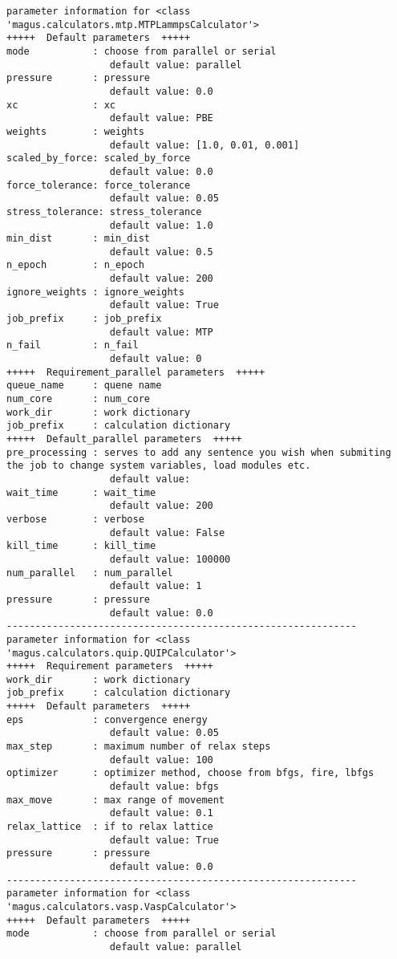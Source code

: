 \documentclass[12pt,oneside]{book}
\begin{document}
\begin{tcolorbox}
\begin{verbatim}
parameter information for <class 'magus.calculators.mtp.MTPLammpsCalculator'>
+++++  Default parameters  +++++
mode           : choose from parallel or serial
                  default value: parallel
pressure       : pressure
                  default value: 0.0
xc             : xc
                  default value: PBE
weights        : weights
                  default value: [1.0, 0.01, 0.001]
scaled_by_force: scaled_by_force
                  default value: 0.0
force_tolerance: force_tolerance
                  default value: 0.05
stress_tolerance: stress_tolerance
                  default value: 1.0
min_dist       : min_dist
                  default value: 0.5
n_epoch        : n_epoch
                  default value: 200
ignore_weights : ignore_weights
                  default value: True
job_prefix     : job_prefix
                  default value: MTP
n_fail         : n_fail
                  default value: 0
+++++  Requirement_parallel parameters  +++++
queue_name     : quene name
num_core       : num_core
work_dir       : work dictionary
job_prefix     : calculation dictionary
+++++  Default_parallel parameters  +++++
pre_processing : serves to add any sentence you wish when submiting the job to change system variables, load modules etc.
                  default value: 
wait_time      : wait_time
                  default value: 200
verbose        : verbose
                  default value: False
kill_time      : kill_time
                  default value: 100000
num_parallel   : num_parallel
                  default value: 1
pressure       : pressure
                  default value: 0.0
-------------------------------------------------------------
parameter information for <class 'magus.calculators.quip.QUIPCalculator'>
+++++  Requirement parameters  +++++
work_dir       : work dictionary
job_prefix     : calculation dictionary
+++++  Default parameters  +++++
eps            : convergence energy
                  default value: 0.05
max_step       : maximum number of relax steps
                  default value: 100
optimizer      : optimizer method, choose from bfgs, fire, lbfgs
                  default value: bfgs
max_move       : max range of movement
                  default value: 0.1
relax_lattice  : if to relax lattice
                  default value: True
pressure       : pressure
                  default value: 0.0
-------------------------------------------------------------
parameter information for <class 'magus.calculators.vasp.VaspCalculator'>
+++++  Default parameters  +++++
mode           : choose from parallel or serial
                  default value: parallel

\end{verbatim}
\end{tcolorbox}
\end{document}
